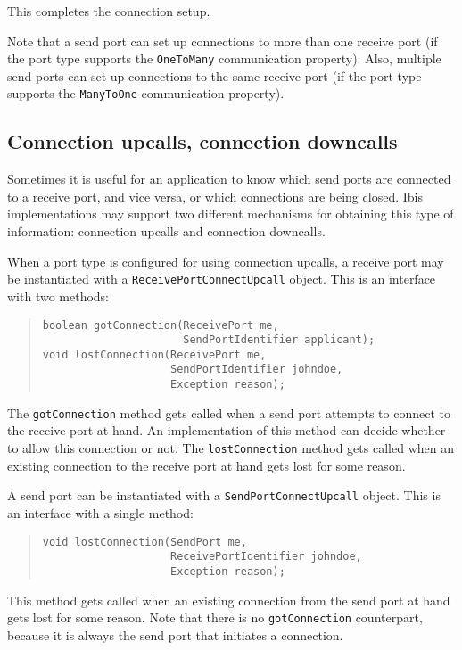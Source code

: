 \documentclass[10pt]{article}
\newcommand{\mysubsection}[1]{\subsection{#1}\label{#1}}
\begin{document}
This completes the connection setup.

Note that a send port can set up connections to more than one
receive port (if the port type supports the \verb+OneToMany+
communication property). Also, multiple send ports can set up
connections to the same receive port (if the port type supports
the \verb+ManyToOne+ communication property).

\mysubsection{Connection upcalls, connection downcalls}

Sometimes it is useful for an application to know which send ports
are connected to a receive port, and vice versa, or which connections
are being closed.
Ibis implementations may support two different mechanisms for obtaining
this type of information: connection upcalls and connection downcalls.

When a port type is configured for using connection upcalls,
a receive port may be instantiated with a \verb+ReceivePortConnectUpcall+
object. This is an interface with two methods:

\begin{quote}
\begin{verbatim}
boolean gotConnection(ReceivePort me,
                      SendPortIdentifier applicant);
void lostConnection(ReceivePort me,
                    SendPortIdentifier johndoe,
                    Exception reason);
\end{verbatim}
\end{quote}

The \verb+gotConnection+ method gets called when a send port attempts
to connect to the receive port at hand.
An implementation of this method can decide whether
to allow this connection or not.
The \verb+lostConnection+ method gets called when an existing connection
to the receive port at hand gets lost for some reason.

A send port can be instantiated with a
\verb+SendPortConnectUpcall+ object. This is an interface with a single method:

\begin{quote}
\begin{verbatim}
void lostConnection(SendPort me,
                    ReceivePortIdentifier johndoe,
                    Exception reason);
\end{verbatim}
\end{quote}

This method gets called when an existing connection from the send port at
hand gets lost for some reason. Note that there is no \verb+gotConnection+
counterpart, because it is always the send port that initiates a connection.
\end{document}
